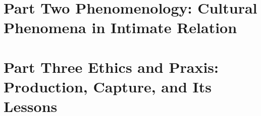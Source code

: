 \documentclass[11pt,a4paper]{article}
\begin{document}
\part*{\textcolor{rosedeep}{Part Two \quad Phenomenology: Cultural Phenomena in Intimate Relation}}


\part*{\textcolor{rosedeep}{Part Three \quad Ethics and Praxis: Production, Capture, and Its Lessons}}


\printbibliography[heading=bibintoc]
\end{document}
